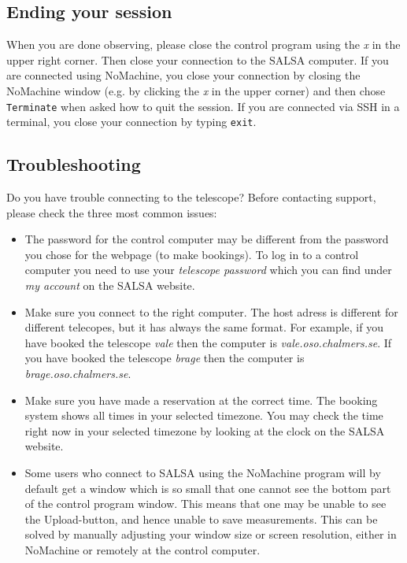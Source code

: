 \subsection{Ending your session}
When you are done observing, please close the control program using the
\emph{x} in the upper right corner. Then close your connection to the SALSA
computer. If you are connected using NoMachine, you close your connection by
closing the NoMachine window (e.g. by clicking the \emph{x} in the upper corner) 
and then chose {\tt Terminate} when asked how to quit the
session. If you are connected via SSH in a terminal, you close your connection by 
typing {\tt exit}.

\subsection{Troubleshooting}
Do you have trouble connecting to the telescope? Before contacting support,
please check the three most common issues:
\begin{itemize} 
\item The password for the control computer may be different from the password
you chose for the webpage (to make bookings). To log in to a control computer
you need to use your \emph{telescope password} which you can find under
\emph{my account} on the SALSA website.
\item Make sure you connect to the right computer. The host adress is different
for different telecopes, but it has always the same format. For example, if
you have booked the telescope \emph{vale} then the computer is
\emph{vale.oso.chalmers.se}. If you have booked the telescope \emph{brage}
then the computer is \emph{brage.oso.chalmers.se}. 
\item Make sure you have made a reservation at the correct time. The booking
	system shows all times in your selected timezone. You may check the time
	right now in your selected timezone by looking at the clock on the SALSA
	website. 
\item Some users who connect to SALSA using the NoMachine program will
by default get a window which is so small that one cannot see the bottom 
part of the control program window. This means that one may be unable to
see the Upload-button, and hence unable to save measurements. This can
be solved by manually adjusting your window size or screen resolution,
either in NoMachine or remotely at the control computer. 
\end{itemize}

